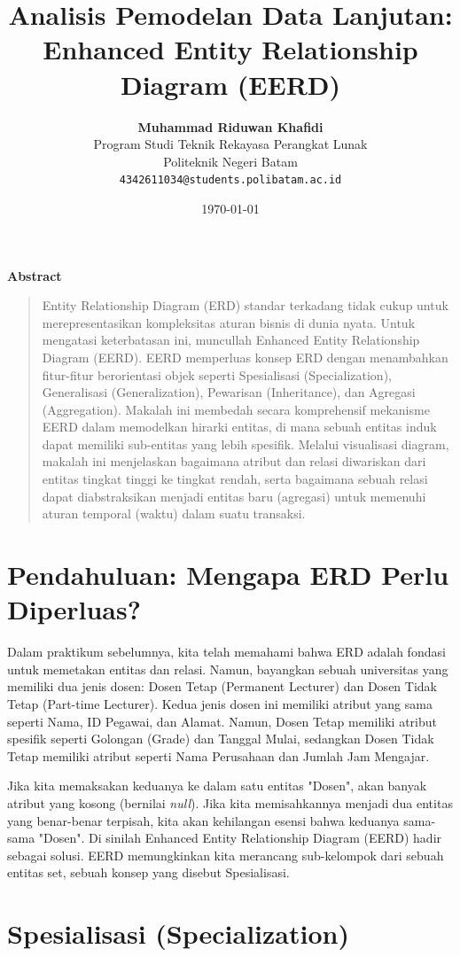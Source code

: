 \documentclass[11pt,a4paper]{article}
\title{\vspace{-1.5cm}\textbf{\sffamily\LARGE Analisis Pemodelan Data Lanjutan: \\ Enhanced Entity Relationship Diagram (EERD)}}
\author{
	\textbf{Muhammad Riduwan Khafidi} \\
	\small Program Studi Teknik Rekayasa Perangkat Lunak \\
	\small Politeknik Negeri Batam \\
	\small \texttt{4342611034@students.polibatam.ac.id}
}
\date{\small\today}
\renewenvironment{abstract}
{\small
	\begin{center}\textbf{\sffamily Abstract}\end{center}
	\begin{quote}}
	{\end{quote}}
\begin{document}
\maketitle
\thispagestyle{empty}

\begin{abstract}
	Entity Relationship Diagram (ERD) standar terkadang tidak cukup untuk merepresentasikan kompleksitas aturan bisnis di dunia nyata. Untuk mengatasi keterbatasan ini, muncullah Enhanced Entity Relationship Diagram (EERD). EERD memperluas konsep ERD dengan menambahkan fitur-fitur berorientasi objek seperti Spesialisasi (Specialization), Generalisasi (Generalization), Pewarisan (Inheritance), dan Agregasi (Aggregation). Makalah ini membedah secara komprehensif mekanisme EERD dalam memodelkan hirarki entitas, di mana sebuah entitas induk dapat memiliki sub-entitas yang lebih spesifik. Melalui visualisasi diagram, makalah ini menjelaskan bagaimana atribut dan relasi diwariskan dari entitas tingkat tinggi ke tingkat rendah, serta bagaimana sebuah relasi dapat diabstraksikan menjadi entitas baru (agregasi) untuk memenuhi aturan temporal (waktu) dalam suatu transaksi.
\end{abstract}

\section{Pendahuluan: Mengapa ERD Perlu Diperluas?}

Dalam praktikum sebelumnya, kita telah memahami bahwa ERD adalah fondasi untuk memetakan entitas dan relasi. Namun, bayangkan sebuah universitas yang memiliki dua jenis dosen: Dosen Tetap (Permanent Lecturer) dan Dosen Tidak Tetap (Part-time Lecturer). Kedua jenis dosen ini memiliki atribut yang sama seperti Nama, ID Pegawai, dan Alamat. Namun, Dosen Tetap memiliki atribut spesifik seperti Golongan (Grade) dan Tanggal Mulai, sedangkan Dosen Tidak Tetap memiliki atribut seperti Nama Perusahaan dan Jumlah Jam Mengajar.

Jika kita memaksakan keduanya ke dalam satu entitas "Dosen", akan banyak atribut yang kosong (bernilai \textit{null}). Jika kita memisahkannya menjadi dua entitas yang benar-benar terpisah, kita akan kehilangan esensi bahwa keduanya sama-sama "Dosen". Di sinilah Enhanced Entity Relationship Diagram (EERD) hadir sebagai solusi. EERD memungkinkan kita merancang sub-kelompok dari sebuah entitas set, sebuah konsep yang disebut Spesialisasi.

\section{Spesialisasi (Specialization)}
\end{document}
